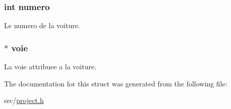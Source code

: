 \subsubsection[{numero}]{\setlength{\rightskip}{0pt plus 5cm}int numero}\label{struct_voiture_a2c30f43104974e72e2809fb4569804b0}
Le numero de la voiture. \hypertarget{struct_voiture_acce856164d15fb4096637b544821166d}{}
\subsubsection[{voie}]{$\ast$ voie}\label{struct_voiture_acce856164d15fb4096637b544821166d}
La voie attribuee a la voiture. 

The documentation for this struct was generated from the following file\+:\begin{DoxyCompactItemize}
\item 
src/\hyperlink{project_8h}{project.\+h}\end{DoxyCompactItemize}
